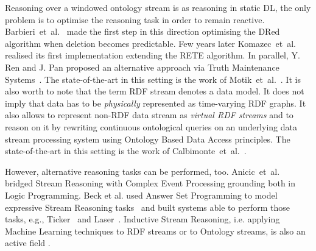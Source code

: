 Reasoning over a windowed ontology stream is as reasoning in static DL, the only problem is to optimise the reasoning task in order to remain reactive. Barbieri~et~al.~\cite{DBLP:conf/esws/BarbieriBCVG10} made the first step in this direction optimising the DRed algorithm when deletion becomes predictable. Few years later Komazec~et~al.~\cite{DBLP:conf/debs/KomazecCF12} realised its first implementation extending the RETE algorithm. In parallel, Y. Ren and J. Pan proposed an alternative approach via Truth Maintenance Systems~\cite{Ren2011}. The state-of-the-art in this setting is the work of Motik~et~al.~\cite{DBLP:conf/aaai/MotikNPH15a}.  It is also worth to note that the term RDF stream denotes a data model. It does not imply that data has to be \emph{physically} represented as time-varying RDF graphs. It also allows to represent non-RDF data stream as \emph{virtual RDF streams} and to reason on it by rewriting continuous ontological queries on an underlying data stream processing system using Ontology Based Data Access principles. The state-of-the-art in this setting is the work of Calbimonte~et~al.~\cite{DBLP:conf/esws/CalbimonteMC16}.

However, alternative reasoning tasks can be performed, too. Anicic~et~al.~\cite{DBLP:journals/semweb/AnicicRFS12} bridged Stream Reasoning with Complex Event Processing grounding both in Logic Programming. Beck et al. used Answer Set Programming to model expressive Stream Reasoning tasks~\cite{DBLP:conf/aaai/BeckDEF15} and built systems able to perform those tasks, e.g.,  Ticker~\cite{DBLP:journals/tplp/BeckEB17} and Laser~\cite{DBLP:conf/semweb/BazoobandiBU17}. Inductive Stream Reasoning, i.e. applying Machine Learning techniques to RDF streams or to Ontology streams, is also an active field \cite{DBLP:conf/ijcai/ChenLPC17,DBLP:conf/ijcai/LecueP13,DBLP:journals/expert/BarbieriBCVHTRW10} .
